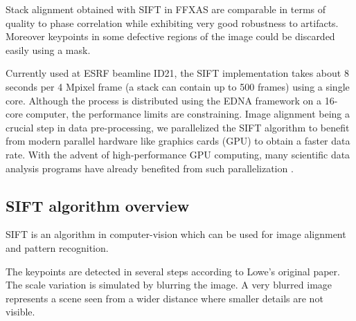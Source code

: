 \documentclass[preprint]{iucr}
\begin{document}
Stack alignment obtained with SIFT in FFXAS are comparable in terms of
quality to phase correlation while exhibiting very good robustness
to artifacts.
Moreover keypoints in some defective regions of the image could be
discarded easily using a mask.

Currently used at ESRF beamline ID21, the SIFT implementation takes about 8
seconds per 4 Mpixel frame  (a stack can contain up to  500 frames) using
a single core.
Although the process is distributed using the EDNA framework \cite{edna} on a 
16-core computer, the performance limits are constraining.
Image alignment being a crucial step in data pre-processing, we parallelized the
SIFT algorithm to benefit from modern parallel
hardware like graphics cards (GPU) to obtain a faster data rate.
With the advent of high-performance GPU computing, many scientific data analysis
programs have already benefited from such parallelization
\cite{pyhst2,pyfai,pynx}.

\subsection{SIFT algorithm overview}
SIFT is an algorithm in computer-vision which can be used for image alignment
and pattern recognition.  

The keypoints are detected in several steps according to Lowe's
original paper\cite{Lowe99}.
The scale variation is simulated by blurring the image.
A very blurred image represents a scene seen from a wider distance where
smaller details are not visible.
\end{document}
